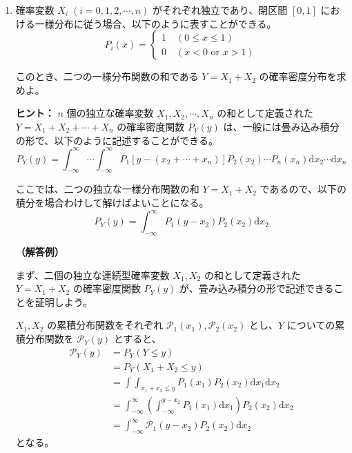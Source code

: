 \documentclass[uplatex,dvipdfmx,a4paper,11pt]{jsarticle}
\newcommand{\diff}{\mathrm d}
\begin{document}
\begin{enumerate}
\setlength{\parskip}{0cm} %
\setlength{\itemsep}{0.5cm} %

\item

確率変数 $X_i \; (i=0, 1, 2, \cdots, n)$ がそれぞれ独立であり、閉区間 $\left[0, 1 \right]$ における一様分布に従う場合、以下のように表すことができる。
\begin{equation*}
P_i(x) = 
\begin{cases}
1 \quad \text{$\left( 0 \leq x \leq 1 \right)$} \\
0 \quad \text{$\left( x < 0 \right. $ or  $\left. x > 1 \right)$}
\end{cases}
\end{equation*}

このとき、二つの一様分布関数の和である $Y=X_1 + X_2$ の確率密度分布を求めよ。

\begin{itembox}[l]{{\bf ヒント：}}
$n$ 個の独立な確率変数 $X_1, X_2, \cdots, X_n$ の和として定義された $Y = X_1 + X_2 +\cdots +X_n $ の確率密度関数 $P_Y(y)$ は、一般には畳み込み積分の形で、以下のように記述することができる。
\begin{equation*}
P_Y(y) = \int_{-\infty}^{\infty} \cdots \int_{-\infty}^{\infty} P_1[y-(x_2 + \cdots +x_n)] P_2(x_2) \cdots P_n(x_n) \diff x_2 \cdots \diff x_n
\end{equation*}

ここでは、二つの独立な一様分布関数の和 $Y=X_1 + X_2$ であるので、以下の積分を場合わけして解けばよいことになる。
\begin{equation*}
P_Y(y) = \int_{-\infty}^{\infty} P_1(y - x_2) P_2(x_2) \diff x_2
\end{equation*}

\end{itembox}

{\bf（解答例）}

まず、二個の独立な連続型確率変数 $X_1, X_2$ の和として定義された $Y = X_1 + X_2 $ の確率密度関数 $P_Y(y)$ が、畳み込み積分の形で記述できることを証明しよう。

$X_1, X_2$ の累積分布関数をそれぞれ $\mathcal{P}_1(x_1), \mathcal{P}_2(x_2)$ とし、$Y$ についての累積分布関数を $\mathcal{P}_Y(y)$ とすると、
\begin{align*}
\mathcal{P}_Y (y) 
	&=P_Y(Y \le y) \\
	&=P_Y(X_1+X_2 \le y) \\
	&=\int \int_{x_1 + x_2 \le y} P_1(x_1) P_2(x_2) \diff x_1 \diff x_2 \\
	&=\int_{-\infty}^{\infty} \left( \int_{-\infty}^{y-x_2} P_1(x_1) \diff x_1 \right) P_2(x_2) \diff x_2 \\
	&=\int_{-\infty}^{\infty} \mathcal{P}_1(y-x_2) P_2(x_2) \diff x_2
\end{align*}
となる。


\end{enumerate}
\end{document}
